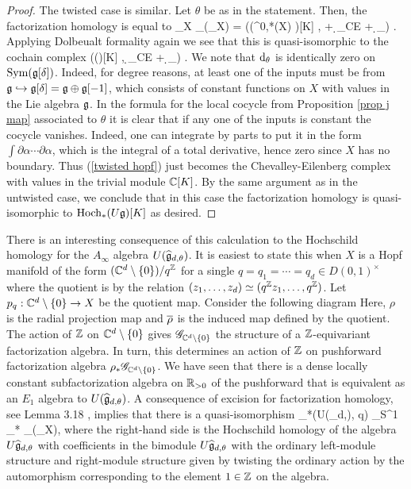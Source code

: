 \documentclass[10pt]{amsart}
\begin{document}
\begin{proof}
The twisted case is similar. 
Let $\theta$ be as in the statement.
Then, the factorization homology is equal to
\ben
\int_X \UU_\theta (\sG_X) = \left(\Sym(\Omega^{0,*}(X) \tensor \fg)[K] , \dbar + \d_{CE} + \d_\theta\right) .
\een
Applying Dolbeualt formality again we see that this is quasi-isomorphic to the cochain complex
\be\label{twisted hopf}
\left(\Sym(\fg[\delta])[K] ,  \d_{CE} + \d_\theta \right) .
\ee
We note that $\d_\theta$ is identically zero on $\Sym(\fg[\delta])$. 
Indeed, for degree reasons, at least one of the inputs must be from $\fg \hookrightarrow \fg[\delta] = \fg \oplus \fg[-1]$, which consists of constant functions on $X$ with values in the Lie algebra $\fg$. 
In the formula for the local cocycle from Proposition \ref{prop j map} associated to $\theta$ it is clear that if any one of the inputs is constant the cocycle vanishes. 
Indeed, one can integrate by parts to put it in the form $\int \partial \alpha \cdots \partial \alpha$, which is the integral of a total derivative, hence zero since $X$ has no boundary.
Thus (\ref{twisted hopf}) just becomes the Chevalley-Eilenberg complex with values in the trivial module $\CC[K]$. 
By the same argument as in the untwisted case, we conclude that in this case the factorization homology is quasi-isomorphic to $\Hoch_*(U \fg)[K]$ as desired.
\end{proof}

There is an interesting consequence of this calculation to the Hochschild homology for the $A_\infty$ algebra $U(\Hat{\fg}_{d,\theta})$.
It is easiest to state this when $X$ is a Hopf manifold of the form $(\CC^d \setminus \{0\}) / q^\ZZ$ for a single $q =q_1=\cdots=q_d \in D(0,1)^\times$ where the quotient is by the relation $(z_1,\ldots,z_d) \simeq (q^\ZZ z_1,\ldots,q^\ZZ)$.
Let $p_q :  \CC^d \setminus \{0\} \to X$ be the quotient map.
Consider the following diagram
\ben
{}
\een
Here, $\rho$ is the radial projection map and $\Bar{\rho}$ is the induced map defined by the quotient.
The action of $\ZZ$ on $\CC^d \setminus\{0\}$ gives $\sG_{\CC^d \setminus \{0\}}$ the structure of a $\ZZ$-equivariant factorization algebra. 
In turn, this determines an action of $\ZZ$ on pushforward factorization algebra $\rho_* \sG_{\CC^d \setminus \{0\}}$.
We have seen that there is a dense locally constant subfactorization algebra on $\RR_{>0}$ of the pushforward that is equivalent as an $E_1$ algebra to $U(\Hat{\fg}_{d,\theta})$.
A consequence of excision for factorization homology, see Lemma 3.18 \cite{AFTopMan}, implies that there is a quasi-isomorphism
\ben
\Hoch_*(U(\Hat{\fg}_{d,\theta}), q) \simeq \int_{S^1} \Bar{\rho}_* \UU_\alpha(\sG_X),
\een
where the right-hand side is the Hochschild homology of the algebra $U \Hat{\fg}_{d,\theta}$ with coefficients in the bimodule $U \Hat{\fg}_{d, \theta}$ with the ordinary left-module structure and right-module structure given by twisting the ordinary action by the automorphism corresponding to the element $1 \in \ZZ$ on the algebra.
\end{document}
